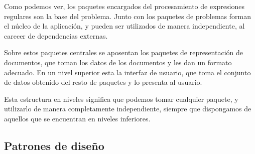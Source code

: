 
Como podemos ver, los paquetes encargados del procesamiento de expresiones regulares son la base del problema.
Junto con los paquetes de problemas forman el núcleo de la aplicación, y pueden ser utilizados de manera independiente, al carecer de dependencias externas.

Sobre estos paquetes centrales se aposentan los paquetes de representación de documentos, que toman los datos de los documentos y les dan un formato adecuado.
En un nivel superior esta la interfaz de usuario, que toma el conjunto de datos obtenido del resto de paquetes y lo presenta al usuario.

Esta estructura en niveles significa que podemos tomar cualquier paquete, y utilizarlo de manera completamente independiente, siempre que dispongamos de aquellos que se encuentran en niveles inferiores.

\subsection{Patrones de diseño}